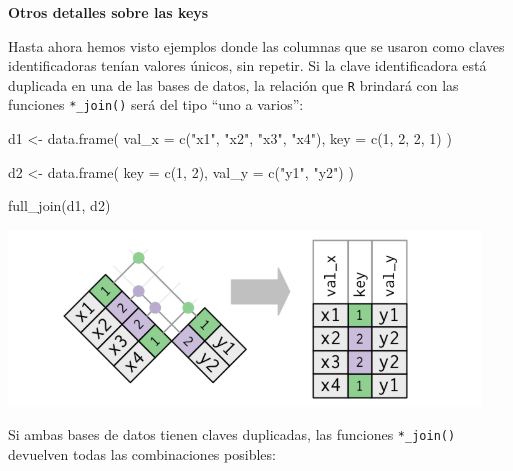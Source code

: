 \documentclass[
]{book}
\newenvironment{Shaded}{\begin{snugshade}}{\end{snugshade}}
\newcommand{\AttributeTok}[1]{\textcolor[rgb]{0.77,0.63,0.00}{#1}}
\newcommand{\DecValTok}[1]{\textcolor[rgb]{0.00,0.00,0.81}{#1}}
\newcommand{\FunctionTok}[1]{\textcolor[rgb]{0.00,0.00,0.00}{#1}}
\newcommand{\NormalTok}[1]{#1}
\newcommand{\OtherTok}[1]{\textcolor[rgb]{0.56,0.35,0.01}{#1}}
\newcommand{\StringTok}[1]{\textcolor[rgb]{0.31,0.60,0.02}{#1}}
\begin{document}
\textbf{Otros detalles sobre las keys}

Hasta ahora hemos visto ejemplos donde las columnas que se usaron como claves identificadoras tenían valores únicos, sin repetir. Si la clave identificadora está duplicada en una de las bases de datos, la relación que \texttt{R} brindará con las funciones \texttt{*\_join()} será del tipo ``uno a varios'':

\begin{Shaded}
\begin{Highlighting}[]
\NormalTok{d1 }\OtherTok{\textless{}{-}} \FunctionTok{data.frame}\NormalTok{(}
  \AttributeTok{val\_x =} \FunctionTok{c}\NormalTok{(}\StringTok{"x1"}\NormalTok{, }\StringTok{"x2"}\NormalTok{, }\StringTok{"x3"}\NormalTok{, }\StringTok{"x4"}\NormalTok{), }
  \AttributeTok{key =} \FunctionTok{c}\NormalTok{(}\DecValTok{1}\NormalTok{, }\DecValTok{2}\NormalTok{, }\DecValTok{2}\NormalTok{, }\DecValTok{1}\NormalTok{)}
\NormalTok{)}

\NormalTok{d2 }\OtherTok{\textless{}{-}} \FunctionTok{data.frame}\NormalTok{(}
  \AttributeTok{key =} \FunctionTok{c}\NormalTok{(}\DecValTok{1}\NormalTok{, }\DecValTok{2}\NormalTok{), }
  \AttributeTok{val\_y =} \FunctionTok{c}\NormalTok{(}\StringTok{"y1"}\NormalTok{, }\StringTok{"y2"}\NormalTok{)}
\NormalTok{)}

\FunctionTok{full\_join}\NormalTok{(d1, d2)}
\end{Highlighting}
\end{Shaded}

\begin{center}\includegraphics[width=0.5\linewidth]{images/06_archivos/1dupkeys} \end{center}

Si ambas bases de datos tienen claves duplicadas, las funciones \texttt{*\_join()} devuelven todas las combinaciones posibles:
\end{document}
